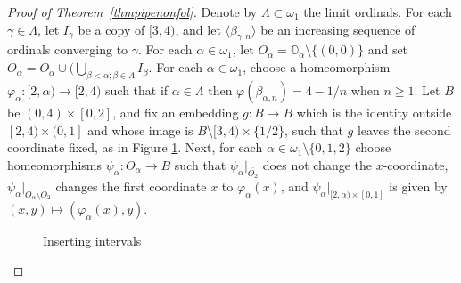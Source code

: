 \documentclass{amsart}
\begin{document}
\begin{proof}[Proof of Theorem~\ref{thmpipenonfol}]
Denote by $\Lambda\subset\omega_1$ the limit ordinals. For each $\gamma\in\Lambda$, let $I_\gamma$ be a copy of $[3,4)$, and let $\langle\beta_{\gamma,n}\rangle$ be an increasing sequence of ordinals converging to $\gamma$. For each $\alpha\in\omega_1$, let $O_\alpha=\mathbb O_\alpha\setminus\{(0,0)\}$ and set $\widetilde{O}_\alpha=O_\alpha\cup(\bigcup_{\beta<\alpha; \beta\in\Lambda}I_\beta$. For each $\alpha\in\omega_1$, choose a homeomorphism $\varphi_\alpha:[2,\alpha)\to[2,4)$ such that if $\alpha\in\Lambda$ then $\varphi(\beta_{\alpha,n})=4-1/n$ when $n\ge 1$. Let $B$ be $(0,4)\times[0,2]$, and fix an embedding  $g:B\to B$ which is the identity outside $[2,4)\times(0,1]$ and whose image is $B \setminus [3,4)\times\{1/2\}$, such that $g$ leaves the second coordinate fixed, as in Figure \ref{noFoliation}. Next, for each $\alpha\in\omega_1\setminus\{0,1,2\}$ choose homeomorphisms $\psi_\alpha:O_\alpha\to B$ such that $\psi_\alpha|_{\overline{O_2}}$ does not change the $x$-coordinate, $\psi_\alpha|_{O_\alpha\setminus O_2}$ changes the first coordinate $x$ to $\varphi_\alpha(x)$, and $\psi_\alpha |_{[2,\alpha)\times[0,1]}$ is given by $(x,y)\mapsto (\varphi_\alpha(x),y)$.

\begin{figure}[h]
\centering
    \caption{\label{noFoliation} Inserting intervals}
\end{figure}


\end{proof}
\end{document}
